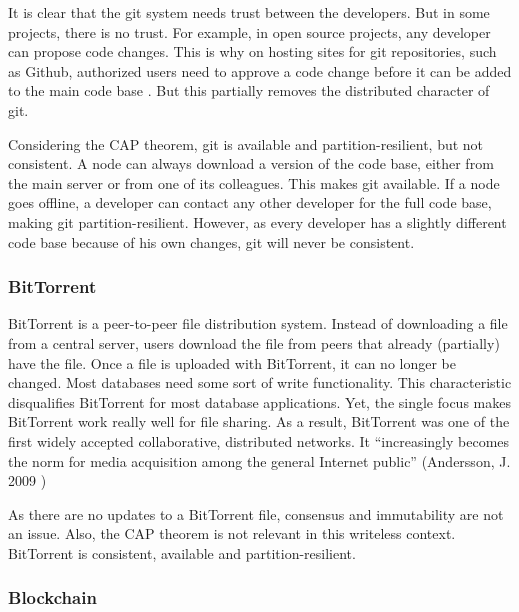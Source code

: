 It is clear that the git system needs trust between the developers. But in some projects, there is no trust. For example, in open source projects, any developer can propose code changes. This is why on hosting sites for git repositories, such as Github, authorized users need to approve a code change before it can be added to the main code base \cite{github-pr}. But this partially removes the distributed character of git.

Considering the CAP theorem, git is available and partition-resilient, but not consistent. A node can always download a version of the code base, either from the main server or from one of its colleagues. This makes git available. If a node goes offline, a developer can contact any other developer for the full code base, making git partition-resilient. However, as every developer has a slightly different code base because of his own changes, git will never be consistent.

\subsubsection{BitTorrent}

BitTorrent is a peer-to-peer file distribution system. Instead of downloading a file from a central server, users download the file from peers that already (partially) have the file. Once a file is uploaded with BitTorrent, it can no longer be changed. Most databases need some sort of write functionality. This characteristic disqualifies BitTorrent for most database applications. Yet, the single focus makes BitTorrent work really well for file sharing. As a result, BitTorrent was one of the first widely accepted collaborative, distributed networks. It ``increasingly becomes the norm for media acquisition among the general Internet public'' (Andersson, J. 2009 \cite{bittorrent-norm})

As there are no updates to a BitTorrent file, consensus and immutability are not an issue. Also, the CAP theorem is not relevant in this writeless context. BitTorrent is consistent, available and partition-resilient.

\subsubsection{Blockchain}
\label{subsubsec:blockchain-as-distributed-dbs}

